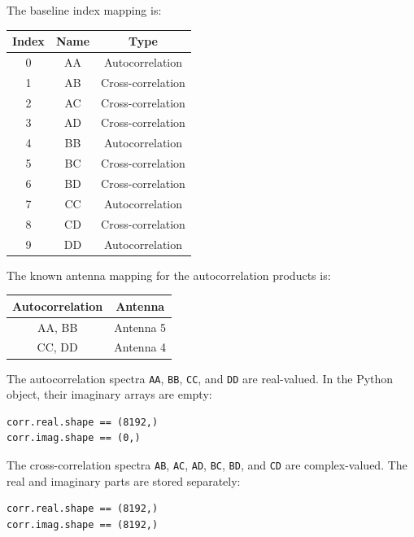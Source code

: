 \documentclass[12pt]{extarticle}
\begin{document}
The baseline index mapping is:
\begin{center}
\begin{tabular}{c c c}
\hline
Index & Name & Type \\
\hline
0 & AA & Autocorrelation \\
1 & AB & Cross-correlation \\
2 & AC & Cross-correlation \\
3 & AD & Cross-correlation \\
4 & BB & Autocorrelation \\
5 & BC & Cross-correlation \\
6 & BD & Cross-correlation \\
7 & CC & Autocorrelation \\
8 & CD & Cross-correlation \\
9 & DD & Autocorrelation \\
\hline
\end{tabular}
\end{center}

The known antenna mapping for the autocorrelation products is:
\begin{center}
\begin{tabular}{c c}
\hline
Autocorrelation & Antenna \\
\hline
AA, BB & Antenna 5 \\
CC, DD & Antenna 4 \\
\hline
\end{tabular}
\end{center}

The autocorrelation spectra \texttt{AA}, \texttt{BB}, \texttt{CC}, and \texttt{DD} are real-valued. In the Python object, their imaginary arrays are empty:
\begin{lstlisting}
corr.real.shape == (8192,)
corr.imag.shape == (0,)
\end{lstlisting}

The cross-correlation spectra \texttt{AB}, \texttt{AC}, \texttt{AD}, \texttt{BC}, \texttt{BD}, and \texttt{CD} are complex-valued. The real and imaginary parts are stored separately:
\begin{lstlisting}
corr.real.shape == (8192,)
corr.imag.shape == (8192,)
\end{lstlisting}
\end{document}
